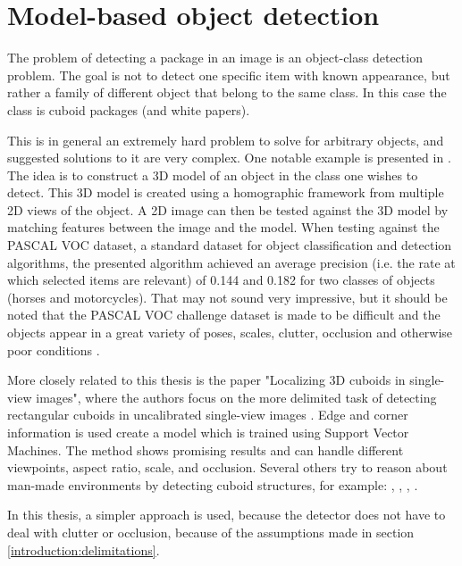 \section{Model-based object detection} \label{related_work:object_detection}
The problem of detecting a package in an image is an object-class detection problem.
The goal is not to detect one specific item with known appearance, but rather a family of different object that belong to the same class.
In this case the class is cuboid packages (and white papers).

This is in general an extremely hard problem to solve for arbitrary objects, and suggested solutions to it are very complex.
One notable example is presented in \cite{yan20073d}. The idea is to construct a 3D model of an object in the class one wishes to detect.
This 3D model is created using a homographic framework from  multiple 2D views of the object.
A 2D image can then be tested against the 3D model by matching features between the image and the model. 
When testing against the PASCAL VOC dataset, a standard dataset for object classification and detection algorithms, the presented algorithm achieved an average precision (i.e. the rate at which selected items are relevant) of 0.144 and 0.182 for two classes of objects (horses and motorcycles).
That may not sound very impressive, but it should be noted that the PASCAL VOC challenge dataset is made to be difficult and the objects appear in a great variety of poses, scales, clutter, occlusion and otherwise poor conditions \cite{everingham2010pascal}.

More closely related to this thesis is the paper "Localizing 3D cuboids in single-view images", where the authors focus on the more delimited task of detecting rectangular cuboids in uncalibrated single-view images \cite{xiaolocalizing}.
Edge and corner information is used create a model which is trained using Support Vector Machines.
The method shows promising results and can handle different viewpoints, aspect ratio, scale, and occlusion.
Several others try to reason about man-made environments by detecting cuboid structures, for example: \cite{hedau2010thinking}, \cite{hedau2012recovering}, \cite{gupta2010estimating}, \cite{del2012bayesian}.

In this thesis, a simpler approach is used, because the detector does not have to deal with clutter or occlusion, because of the assumptions made in section \ref{introduction:delimitations}.
